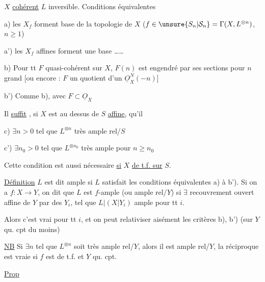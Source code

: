 
$X$ \uline{cohérent} $L$ inversible. Conditions équivalentes

a) les $X_f$ forment base de la topologie de $X$ ($f\in\unsure{S_n|\mathcal S_n}=\Gamma(X,L^{\otimes n})$, $n\geq1$)

a') les $X_f$ affines forment une base \ldots\ldots

b) Pour tt $F$ quasi-cohérent  sur $X$, $F(n)$ est engendré par ses sections pour $n$ grand [ou encore : $F$ \inserted{$\simeq$} un quotient d'un $\underline O_X^N(-n)$]

b') Comme b), avec $F\subset\underline O_X$


Il \uline{suffit} , si $X$ est au dessus de $S$ \uline{affine}, qu'il  

c) $\exists n>0$ tel que $L^{\otimes n}$ très ample rel/$S$

c') $\exists n_0>0$ tel que $L^{\otimes n_0}$ très ample pour $n\geq n_0$

Cette condition est aussi nécessaire \uline{si}  $X$ \uline{de t.f. sur} $S$.

\uline{Définition} $L$ est dit ample si $L$ satisfait les conditions équivalentes a) à b'). Si  on a $f:X\longrightarrow Y$,   on dit que $L$ est $f$-ample (ou ample rel/$Y$)  si $\exists$ recouvrement ouvert affine de $Y$ par des $Y_i$, tel que  $L|(X|Y_i)$ ample pour tt $i$.

 Alors c'est vrai pour tt $i$, et on peut relativiser aisément les  critères b), b') (sur $Y$ qu. cpt du moins)


\uline{NB} Si $\exists n$ tel que $L^{\otimes n}$ soit très ample rel/$Y$, alors il est ample rel/$Y$, la réciproque est vraie si $f$ est de t.f. et $Y$ qu. cpt.

\uline{Prop}



